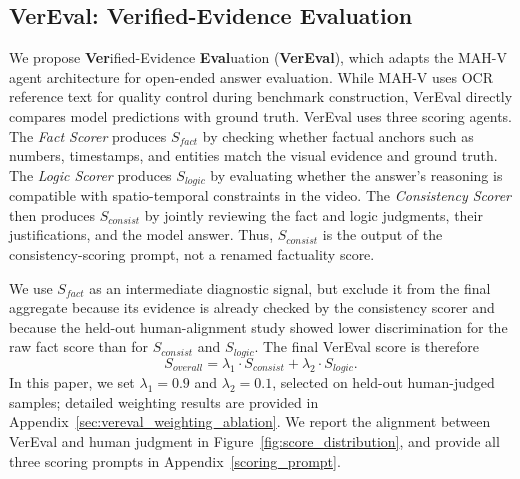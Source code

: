 \subsection{VerEval: Verified-Evidence Evaluation}
We propose \textbf{Ver}ified-Evidence \textbf{Eval}uation (\textbf{VerEval}), which adapts the MAH-V agent architecture for open-ended answer evaluation. While MAH-V uses OCR reference text for quality control during benchmark construction, VerEval directly compares model predictions with ground truth.
VerEval uses three scoring agents. The \textit{Fact Scorer} produces \(S_{fact}\) by checking whether factual anchors such as numbers, timestamps, and entities match the visual evidence and ground truth. The \textit{Logic Scorer} produces \(S_{logic}\) by evaluating whether the answer's reasoning is compatible with spatio-temporal constraints in the video. The \textit{Consistency Scorer} then produces \(S_{consist}\) by jointly reviewing the fact and logic judgments, their justifications, and the model answer. Thus, \(S_{consist}\) is the output of the consistency-scoring prompt, not a renamed factuality score.

We use \(S_{fact}\) as an intermediate diagnostic signal, but exclude it from the final aggregate because its evidence is already checked by the consistency scorer and because the held-out human-alignment study showed lower discrimination for the raw fact score than for \(S_{consist}\) and \(S_{logic}\). The final VerEval score is therefore
\begin{equation}
S_{overall} = \lambda_1 \cdot S_{consist} + \lambda_2 \cdot S_{logic}.
\end{equation}
In this paper, we set \(\lambda_1=0.9\) and \(\lambda_2=0.1\), selected on held-out human-judged samples; detailed weighting results are provided in Appendix~\ref{sec:vereval_weighting_ablation}. We report the alignment between VerEval and human judgment in Figure~\ref{fig:score_distribution}, and provide all three scoring prompts in Appendix~\ref{scoring_prompt}.
